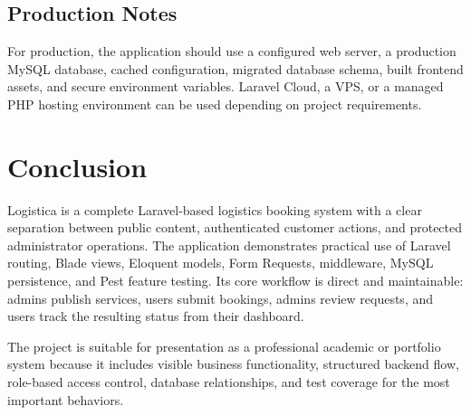 \documentclass[12pt,a4paper]{report}
\newcommand{\project}{Logistica}
\begin{document}
\section{Production Notes}

For production, the application should use a configured web server, a production MySQL database, cached configuration, migrated database schema, built frontend assets, and secure environment variables. Laravel Cloud, a VPS, or a managed PHP hosting environment can be used depending on project requirements.

\chapter{Conclusion}

\project{} is a complete Laravel-based logistics booking system with a clear separation between public content, authenticated customer actions, and protected administrator operations. The application demonstrates practical use of Laravel routing, Blade views, Eloquent models, Form Requests, middleware, MySQL persistence, and Pest feature testing. Its core workflow is direct and maintainable: admins publish services, users submit bookings, admins review requests, and users track the resulting status from their dashboard.

The project is suitable for presentation as a professional academic or portfolio system because it includes visible business functionality, structured backend flow, role-based access control, database relationships, and test coverage for the most important behaviors.
\end{document}
